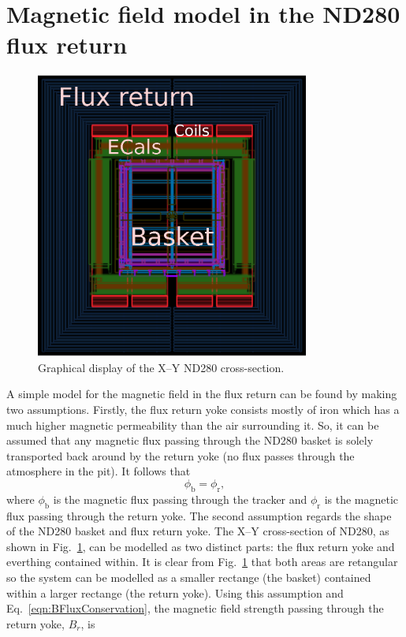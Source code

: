 \section{Magnetic field model in the ND280 flux return}
\label{sec:MagneticFieldModel}
\begin{figure}
  \centering
  \includegraphics[width=9cm]{images/magnetic_field/ND280FluxReturn}
  \caption{Graphical display of the X--Y ND280 cross-section.}
  \label{fig:ND280FluxReturn}
\end{figure}
A simple model for the magnetic field in the flux return can be found by making two assumptions.  Firstly, the flux return yoke consists mostly of iron which has a much higher magnetic permeability than the air surrounding it.  So, it can be assumed that any magnetic flux passing through the ND280 basket is solely transported back around by the return yoke (no flux passes through the atmosphere in the pit).  It follows that
\begin{equation}
  \phi_{\textrm{b}} = \phi_{\textrm{r}},
  \label{eqn:BFluxConservation}
\end{equation}
where $\phi_{\textrm{b}}$ is the magnetic flux passing through the tracker and $\phi_{\textrm{r}}$ is the magnetic flux passing through the return yoke.  The second assumption regards the shape of the ND280 basket and flux return yoke.  The X--Y cross-section of ND280, as shown in Fig.~\ref{fig:ND280FluxReturn}, can be modelled as two distinct parts: the flux return yoke and everthing contained within.  It is clear from Fig.~\ref{fig:ND280FluxReturn} that both areas are retangular so the system can be modelled as a smaller rectange (the basket) contained within a larger rectange (the return yoke).  Using this assumption and Eq.~\ref{eqn:BFluxConservation}, the magnetic field strength passing through the return yoke, $B_{r}$, is
